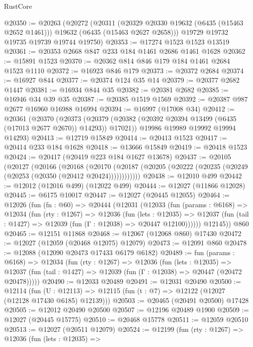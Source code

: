 \begin{lexlean}{RustCore}
\begin{coremodule}
@20350 := @20263
    (@20272
      (@20311
        (@20329 @20330 @19632 (@6435 (@15463 @2652 @1461)))
        @19632
        (@6435 (@15463 @2627 @2658)))
      @19729
      @19732
      @19735
      @19739
      @19744
      @19750)
@20353 := @17274 @1523 @1523 @13519
@20361 := @20353 @2668 @847 @233 @184 @1461 @2686 @1461 @1628
@20362 := @15891 @1523
@20370 := @20362 @814 @846 @179 @184 @1461 @2684 @1523 @1110
@20372 := @16923 @846 @179
@20373 := @20372 @2684
@20374 := @16927 @844
@20377 := @20374 @124 @35 @14
@20379 := @20377 @2682 @1447
@20381 := @16934 @844 @35
@20382 := @20381 @2682
@20385 := @16946 @34 @39 @35
@20387 := @20385 @1519 @1569
@20392 := @20387 @987 @2677 @16960 @16988 @16994
@20394 := @16997 (@17008 @34)
@20412 := @20361
    (@20370
      (@20373 (@20379 (@20382 (@20392 @20394 @13499 (@6435 (@17013 @2677 @2670)) @14293)) @17021))
      @19986
      @19989
      @19992
      @19994
      @14293)
@20413 := @12719 @15849
@20414 := @20413 @1523
@20417 := @20414 @233 @184 @1628
@20418 := @13666 @15849
@20419 := @20418 @1523
@20424 := @20417 (@20419 @223 @184 @1627 @13678)
@20437 := @20105
    (@20127
      (@20166
        (@20168
          (@20170 (@20187 (@20205 (@20222 (@20235 (@20249 (@20253 (@20350 (@20412 @20424))))))))))))
@20438 := @12010 @499
@20442 := @12012 (@12016 @499) (@12022 @499)
@20444 := @12027 (@11866 @12028)
@20445 := @6175 @10017
@20447 := @12027 (@20445 @12055)
@20464 := @12026
    (fun (fn : @60) =>
    @20444
      (@12031
        (@12033
          (fun (params : @6168) =>
          @12034
            (fun (rty : @1267) =>
            @12036
              (fun (lets : @12035) =>
              @12037 (fun (tail : @1427) => @12039 (fun (Γ : @12038) => @20447 @12100))))))
        @12145))
    @860
@20465 := @12151 @11868
@20468 := @12067 (@12068 @860) @17430
@20472 := @12027 (@12059 (@20468 @12075) @12079)
@20473 := @12091 @860
@20478 := @12088 (@12090 @20473 @17433 @6179 @6182)
@20489 := fun (params : @6168) =>
  @12034
    (fun (rty : @1267) =>
    @12036
      (fun (lets : @12035) =>
      @12037 (fun (tail : @1427) => @12039 (fun (Γ : @12038) => @20447 (@20472 @20478)))))
@20490 := @12033 @20489
@20491 := @12031 @20490
@20500 := @12114
    (fun (U : @12113) => @12115 (fun (t : @7) => @12122 (@12027 (@12128 @17430 @6185) @12139)))
@20503 := @20465 (@20491 @20500) @17428
@20505 := @12012 @20490 @20500
@20507 := @12196 @20489 @1900
@20509 := @12027 (@20445 @15775)
@20510 := @20468 @15778
@20511 := @12059 @20510
@20513 := @12027 (@20511 @12079)
@20524 := @12199
    (fun (rty : @1267) =>
    @12036
      (fun (lets : @12035) =>

\end{coremodule}
\end{lexlean}
